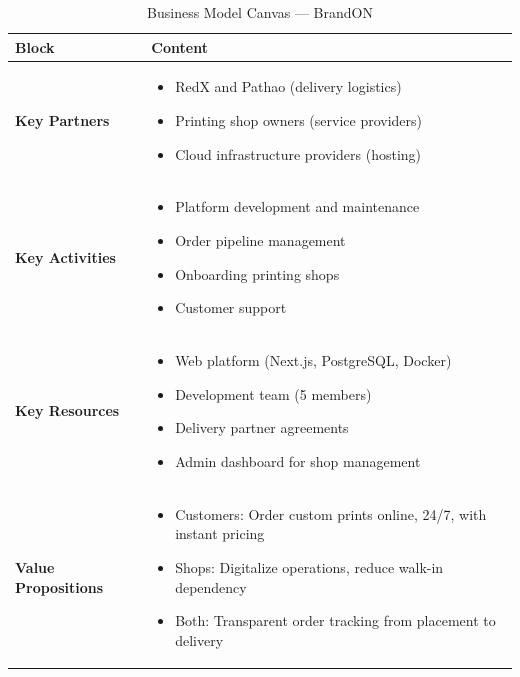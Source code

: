 \documentclass[12pt,a4paper]{report}
\begin{document}
\begin{table}[H]
  \centering
  \caption{Business Model Canvas --- BrandON}
  \begin{tabularx}{\textwidth}{L{3.2cm} X}
    \toprule
    \textbf{Block} & \textbf{Content} \\
    \midrule
    \textbf{Key Partners}
      & \begin{itemize}[noitemsep,topsep=0pt,leftmargin=*]
          \item RedX and Pathao (delivery logistics)
          \item Printing shop owners (service providers)
          \item Cloud infrastructure providers (hosting)
        \end{itemize} \\
    \midrule
    \textbf{Key Activities}
      & \begin{itemize}[noitemsep,topsep=0pt,leftmargin=*]
          \item Platform development and maintenance
          \item Order pipeline management
          \item Onboarding printing shops
          \item Customer support
        \end{itemize} \\
    \midrule
    \textbf{Key Resources}
      & \begin{itemize}[noitemsep,topsep=0pt,leftmargin=*]
          \item Web platform (Next.js, PostgreSQL, Docker)
          \item Development team (5 members)
          \item Delivery partner agreements
          \item Admin dashboard for shop management
        \end{itemize} \\
    \midrule
    \textbf{Value Propositions}
      & \begin{itemize}[noitemsep,topsep=0pt,leftmargin=*]
          \item Customers: Order custom prints online, 24/7, with instant pricing
          \item Shops: Digitalize operations, reduce walk-in dependency
          \item Both: Transparent order tracking from placement to delivery
        \end{itemize} \\

\end{tabularx}
\end{table}
\end{document}
